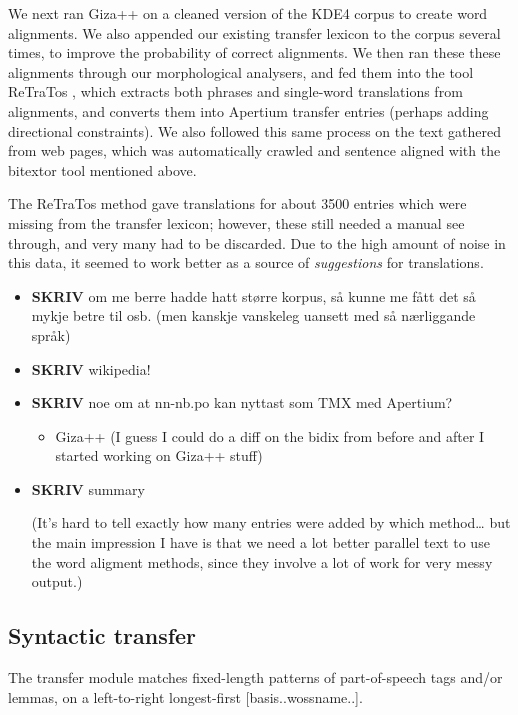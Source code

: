 \documentclass[11pt]{article}
\begin{document}
We next ran Giza++ \citep{och2003scv} on a cleaned version of the KDE4
corpus to create word alignments. We also appended our existing
transfer lexicon to the corpus several times, to improve the
probability of correct alignments. We then ran these these alignments
through our morphological analysers, and fed them into the tool
ReTraTos \citep{caseli2006aib}, which extracts both phrases and
single-word translations from alignments, and converts them into
Apertium transfer entries (perhaps adding directional constraints). We
also followed this same process on the text gathered from web pages,
which was automatically crawled and sentence aligned with the bitextor
tool mentioned above.

The ReTraTos method gave translations for about 3500 entries which
were missing from the transfer lexicon; however, these still needed a
manual see through, and very many had to be discarded. Due to the high
amount of noise in this data, it seemed to work better as a source of
\emph{suggestions} for translations.

\begin{itemize}
\item \textbf{SKRIV} om me berre hadde hatt større korpus, så kunne me fått det så mykje betre til osb. (men kanskje vanskeleg uansett med så nærliggande språk)
\item \textbf{SKRIV} wikipedia!
\item \textbf{SKRIV} noe om at nn-nb.po kan nyttast som TMX med Apertium?
\begin{itemize}
\item Giza++ (I guess I could do a diff on the bidix from before and
  after
  I started working on Giza++ stuff)
\end{itemize}
\item \textbf{SKRIV} summary

(It's hard to tell exactly how many entries were added by which
method\ldots{} but the main impression I have is that we need a lot better
parallel text to use the word aligment methods, since they involve a
lot of work for very messy output.)

\end{itemize} 
\subsection{Syntactic transfer}

The transfer module matches fixed-length patterns of part-of-speech
tags and/or lemmas, on a left-to-right longest-first
[basis..wossname..]. 
\end{document}
